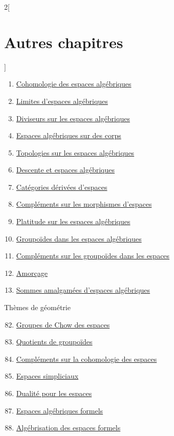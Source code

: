 \begin{multicols}{2}[\section{Autres chapitres}]
\begin{enumerate}
\item \hyperref[spaces-cohomology-section-phantom]{Cohomologie des espaces algébriques}
\item \hyperref[spaces-limits-section-phantom]{Limites d'espaces algébriques}
\item \hyperref[spaces-divisors-section-phantom]{Diviseurs sur les espaces algébriques}
\item \hyperref[spaces-over-fields-section-phantom]{Espaces algébriques sur des corps}
\item \hyperref[spaces-topologies-section-phantom]{Topologies sur les espaces algébriques}
\item \hyperref[spaces-descent-section-phantom]{Descente et espaces algébriques}
\item \hyperref[spaces-perfect-section-phantom]{Catégories dérivées d'espaces}
\item \hyperref[spaces-more-morphisms-section-phantom]{Compléments sur les morphismes d'espaces}
\item \hyperref[spaces-flat-section-phantom]{Platitude sur les espaces algébriques}
\item \hyperref[spaces-groupoids-section-phantom]{Groupoïdes dans les espaces algébriques}
\item \hyperref[spaces-more-groupoids-section-phantom]{Compléments sur les groupoïdes dans les espaces}
\item \hyperref[bootstrap-section-phantom]{Amorçage}
\item \hyperref[spaces-pushouts-section-phantom]{Sommes amalgamées d'espaces algébriques}
\end{enumerate}
Thèmes de géométrie
\begin{enumerate}
\setcounter{enumi}{81}
\item \hyperref[spaces-chow-section-phantom]{Groupes de Chow des espaces}
\item \hyperref[groupoids-quotients-section-phantom]{Quotients de groupoïdes}
\item \hyperref[spaces-more-cohomology-section-phantom]{Compléments sur la cohomologie des espaces}
\item \hyperref[spaces-simplicial-section-phantom]{Espaces simpliciaux}
\item \hyperref[spaces-duality-section-phantom]{Dualité pour les espaces}
\item \hyperref[formal-spaces-section-phantom]{Espaces algébriques formels}
\item \hyperref[restricted-section-phantom]{Algébrisation des espaces formels}

\end{enumerate}
\end{multicols}
